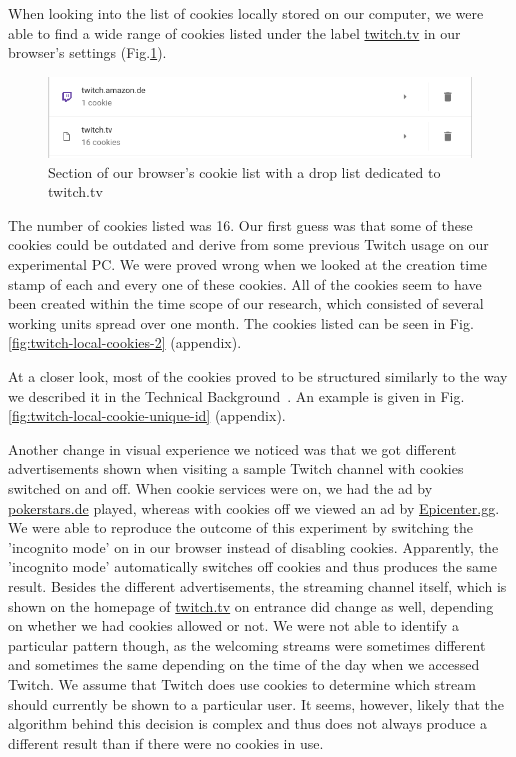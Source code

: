 When looking into the list of cookies locally stored on our computer, we were able to find a wide range of cookies listed under the label \url{twitch.tv} in our browser's settings (Fig.\ref{fig:twitch-local-cookies}). 

\begin{figure}[h!]
	\centering
	\includegraphics[width=0.9\linewidth]{sections/figures/twitch_local_cookies}
	\caption{Section of our browser's cookie list with a drop list dedicated to twitch.tv}
	\label{fig:twitch-local-cookies}
\end{figure}

The number of cookies listed was 16. Our first guess was that some of these cookies could be outdated and derive from some previous Twitch usage on our experimental PC. We were proved wrong when we looked at the creation time stamp of each and every one of these cookies. All of the cookies seem to have been created within the time scope of our research, which consisted of several working units spread over one month. The cookies listed can be seen in Fig.\ref{fig:twitch-local-cookies-2} (appendix). 

At a closer look, most of the cookies proved to be structured similarly to the way we described it in the Technical Background~. 
An example is given in Fig.\ref{fig:twitch-local-cookie-unique-id} (appendix). 

Another change in visual experience we noticed was that we got different advertisements shown when visiting a sample Twitch channel with cookies switched on and off. When cookie services were on, we had the ad by \url{pokerstars.de} played, whereas with cookies off we viewed an ad by \url{Epicenter.gg}. We were able to reproduce the outcome of this experiment by switching the 'incognito mode' on in our browser instead of disabling cookies. Apparently, the 'incognito mode' automatically switches off cookies and thus produces the same result. Besides the different advertisements, the streaming channel itself, which is shown on the homepage of \url{twitch.tv} on entrance did change as well, depending on whether we had cookies allowed or not. We were not able to identify a particular pattern though, as the welcoming streams were sometimes different and sometimes the same depending on the time of the day when we accessed Twitch. We assume that Twitch does use cookies to determine which stream should currently be shown to a particular user. It seems, however, likely that the algorithm behind this decision is complex and thus does not always produce a different result than if there were no cookies in use. 


